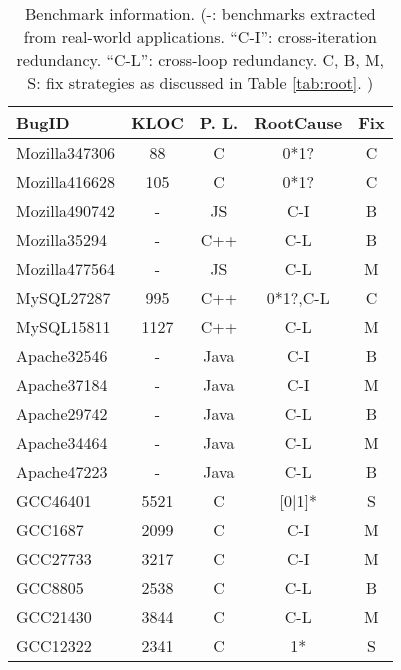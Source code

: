 \begin{table}
  \centering
  \small
  \newcommand{\Yes}[1]{\checkmark{}$_#1$}
  \newcommand{\No}[0]{-}
  \begin{tabular}{lcccc}
    \toprule
   {\bf BugID}           &  {\bf KLOC}     &  {\bf P. L.}           & {\bf RootCause}  & {\bf Fix}\\
   \midrule
   Mozilla347306         & 88              & C                      &  0*1?        & C     \\
   Mozilla416628         & 105             & C                      &  0*1?        & C     \\
   Mozilla490742         &  -             & JS                     &  C-I         & B       \\
   Mozilla35294          &  -             & C++                    &  C-L         & B        \\ 
   Mozilla477564         &  -             & JS                     &  C-L         & M       \\
   \midrule 
   MySQL27287            & 995             & C++                    &  0*1?,C-L        & C     \\
   MySQL15811            & 1127            & C++                    &  C-L         & M \\ 
   \midrule    
   Apache32546           &  -             & Java                   &  C-I         & B  \\
   Apache37184           &  -             & Java                   &  C-I         & M  \\
   Apache29742           &  -             & Java                   &  C-L         & B \\ 
   Apache34464           &  -             & Java                   &  C-L         & M  \\
   Apache47223           &  -             & Java                   &  C-L         & B \\
   \midrule
   GCC46401              & 5521            & C                      &  [0$|$1]*    & S   \\
   GCC1687               & 2099            & C                      &  C-I         & M \\
   GCC27733              & 3217            & C                      &  C-I         & M \\
   GCC8805               & 2538            & C                      &  C-L         & B\\
   GCC21430              & 3844            & C                      &  C-L         & M \\
   GCC12322              & 2341            & C                      &  1*          & S\\
\bottomrule
   \end{tabular}
  \caption{Benchmark information.
  (-: benchmarks extracted from real-world applications.
  ``C-I'': cross-iteration redundancy.
  ``C-L'': cross-loop redundancy.
  C, B, M, S: fix strategies as discussed in
  Table \ref{tab:root}.
  ) 
 }
  \label{tab:benchmarks}
\end{table}


